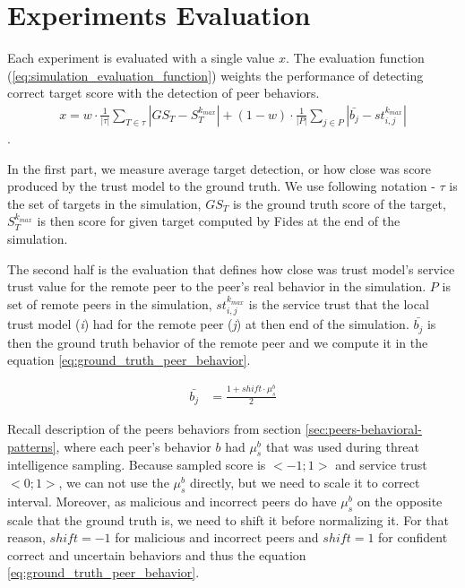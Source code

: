 
\section{Experiments Evaluation}
\label{sec:experiments-evaluation}

Each experiment is evaluated with a single value $x$.
The evaluation function (\ref{eq:simulation_evaluation_function}) weights the performance of detecting correct target score with the detection of peer behaviors.
\begin{equation}
\begin{split}
    x = w \cdot \frac{1}{|\tau|} \sum_{T \in \tau}\left|GS_{T} - S^{k_{max}}_{T} \right| + \left(1 - w\right) \cdot \frac{1}{|P|} \sum_{j \in P}\left|\bar{b_{j}} - st^{k_{max}}_{i, j} \right|
\end{split}
\label{eq:simulation_evaluation_function}
\end{equation}.

In the first part, we measure average target detection, or how close was score produced by the trust model to the ground truth.
We use following notation - $\tau$ is the set of targets in the simulation, $GS_{T}$ is the ground truth score of the target, $S^{k_{max}}_{T}$ is then score for given target computed by Fides at the end of the simulation.

The second half is the evaluation that defines how close was trust model's service trust value for the remote peer to the peer's real behavior in the simulation.
$P$ is set of remote peers in the simulation, $st^{k_{max}}_{i, j}$ is the service trust that the local trust model (\textit{i}) had for the remote peer (\textit{j}) at then end of the simulation.
$\bar{b_{j}}$ is then the ground truth behavior of the remote peer and we compute it in the equation \ref{eq:ground_truth_peer_behavior}.

\begin{equation}
    \begin{split}
    \bar{b_{j}} &= \frac{1 + shift \cdot \mu^{b}_{s}}{2}
    \end{split}
    \label{eq:ground_truth_peer_behavior}
\end{equation}

Recall description of the peers behaviors from section \ref{sec:peers-behavioral-patterns}, where each peer's behavior $b$ had $\mu^{b}_{s}$ that was used during threat intelligence sampling.
Because sampled score is $<-1; 1>$ and service trust $<0; 1>$, we can not use the $\mu^{b}_{s}$ directly, but we need to scale it to correct interval.
Moreover, as malicious and incorrect peers  do have $\mu^{b}_{s}$ on the opposite scale that the ground truth is, we need to shift it before normalizing it.
For that reason, $shift = -1$ for malicious and incorrect peers and $shift = 1$ for confident correct and uncertain behaviors and thus the equation \ref{eq:ground_truth_peer_behavior}.